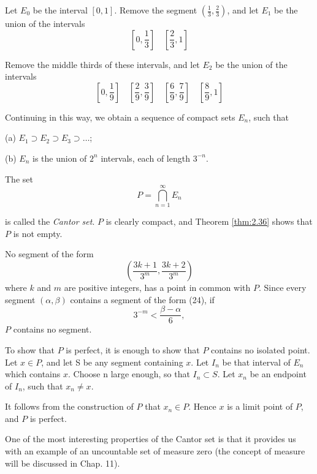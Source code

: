 Let $E_0$ be the interval $[0, 1]$. Remove the segment $(\frac{1}{3}, \frac{2}{3})$, and let $E_1$ be the union of the intervals
\begin{equation*}
    \left[0, \frac{1}{3}\right] \quad 
    \left[\frac{2}{3}, 1\right]
\end{equation*}

Remove the middle thirds of these intervals, and let $E_2$ be the union of the intervals
\begin{equation*}
    \left[0, \frac{1}{9}\right] \quad 
    \left[\frac{2}{9}, \frac{3}{9}\right] \quad 
    \left[\frac{6}{9}, \frac{7}{9}\right] \quad 
    \left[\frac{8}{9}, 1\right]
\end{equation*}

Continuing in this way, we obtain a sequence of compact sets $E_n$, such that

(a) $E_1 \supset E_2 \supset E_3 \supset \dots$;

(b) $E_n$ is the union of $2^n$ intervals, each of length $3^{-n}$.

The set
\begin{equation*}
    P = \bigcap_{n=1}^{\infty} E_n
\end{equation*}

is called the \emph{Cantor set}. $P$ is clearly compact, and Theorem \ref{thm:2.36} shows that $P$ is not empty.

No segment of the form
\begin{equation}
    \left(
        \frac{3k+1}{3^m},
        \frac{3k+2}{3^m}
    \right)
\end{equation}
where $k$ and $m$ are positive integers, has a point in common with $P$. Since every segment $(\alpha, \beta)$ contains a segment of the form (24), if
\begin{equation*}
    3^{-m} < \frac{\beta - \alpha}{6},
\end{equation*}
$P$ contains no segment.

To show that $P$ is perfect, it is enough to show that $P$ contains no isolated point. Let $x \in P$, and let S be any segment containing $x$. Let $I_n$ be that interval of $E_n$ which contains $x$. Choose n large enough, so that $I_n \subset S$. Let $x_n$ be an endpoint of $I_n$, such that $x_n \neq x$.

It follows from the construction of $P$ that $x_n \in P$. Hence $x$ is a limit point of $P$, and $P$ is perfect.

One of the most interesting properties of the Cantor set is that it provides
us with an example of an uncountable set of measure zero (the concept of
measure will be discussed in Chap. 11).
